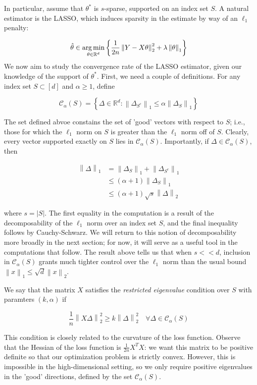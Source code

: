 \documentclass{article}
\newcommand{\R}{\mathbb{R}}
\newcommand{\cC}{\mathcal{C}}
\newcommand{\argmin}{\mathop{\rm arg\,min}}
\newcommand{\norm}[1]{\left\|#1\right\|}
\begin{document}
In particular, assume that $\theta^{*}$ is $s$-sparse, supported on an index set $S$. A natural estimator is the LASSO, which induces sparsity in the estimate by way of an $\ell_{1}$ penalty:

$$\hat{\theta} \in \argmin_{\theta \in \R^{d}}\left\{\frac{1}{2n}\norm{Y - X\theta}^{2}_{2} + \lambda \norm{\theta}_{1}\right\}$$
We now aim to study the convergence rate of the LASSO estimator, given our knowledge of the support of $\theta^{*}$. First, we need a couple of definitions. For any index set $S \subset [d]$ and $\alpha \geq 1$, define

$$\cC_{\alpha}(S) = \left\{ \Delta \in \R^{d} : \norm{\Delta_{S^{c}}}_{1} \leq \alpha \norm{\Delta_{S}}_{1}\right\}$$

The set defined abvoe constains the set of 'good' vectors with respect to $S$; i.e., those for which the $\ell_{1}$ norm on $S$ is greater than the $\ell_{1}$ norm off of $S$. Clearly, every vector supported exactly on $S$ lies in $\cC_{\alpha}(S)$. Importantly, if $\Delta \in \cC_{\alpha}(S)$, then

\begin{align*}
  \norm{\Delta}_{1}
  &= \norm{\Delta_{S}}_{1} + \norm{\Delta_{S^{c}}}_{1} \\
  &\leq (\alpha + 1)\norm{\Delta_{S}}_{1} \\
  &\leq (\alpha + 1)\sqrt{s}\norm{\Delta}_{2}
\end{align*}

where $s = |S|$. The first equality in the computation is a result of the decomposability of the $\ell_{1}$ norm over an index set $S$, and the final inequality follows by Cauchy-Schwarz. We will return to this notion of  decomposability more broadly in the next section; for now, it will serve as a useful tool in the computations that follow. The result above tells us that when $s << d$, inclusion in $\cC_{\alpha}(S)$ grants much tighter control over the $\ell_{1}$ norm than the usual bound $\norm{x}_{1} \leq \sqrt{d}\norm{x}_{2}$.

We say that the matrix $X$ satisfies the \textit{restricted eigenvalue} condition over $S$ with paramters $(k, \alpha)$ if

$$\frac1n\norm{X\Delta}_{2}^{2} \geq k\norm{\Delta}_{2}^{2} \quad \forall \Delta \in \cC_{\alpha}(S)$$

This condition is closely related to the curvature of the loss function. Observe that the Hessian of the loss function is $\frac{1}{2n} X^{T}X$: we want this matrix to be positive definite so that our optimization problem is strictly convex. However, this is impossible in the high-dimensional setting, so we only require positive eigenvalues in the 'good' directions, defined by the set $\cC_{\alpha}(S)$.
\end{document}
